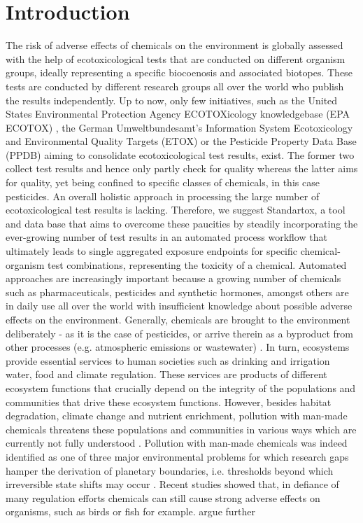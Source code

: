 
\section*{Introduction}

The risk of adverse effects of chemicals on the environment is globally assessed with the help of ecotoxicological tests that are conducted on different organism groups, ideally representing a specific biocoenosis and associated biotopes. These tests are conducted by different research groups all over the world who publish the results independently. Up to now, only few initiatives, such as the United States Environmental Protection Agency ECOTOXicology knowledgebase (EPA ECOTOX) \citep{elonen_ecotoxicology_2018}, the German Umweltbundesamt's Information System Ecotoxicology and Environmental Quality Targets (ETOX) \citep{umweltbundesamt_etox_2019} or the Pesticide Property Data Base (PPDB) \citep{lewis_international_2016} aiming to consolidate ecotoxicological test results, exist. The former two collect test results and hence only partly check for quality whereas the latter aims for quality, yet being confined to specific classes of chemicals, in this case pesticides. An overall holistic approach in processing the large number of ecotoxicological test results is lacking. Therefore, we suggest Standartox, a tool and data base that aims to overcome these paucities by steadily incorporating the ever-growing number of test results in an automated process workflow that ultimately leads to single aggregated exposure endpoints for specific chemical-organism test combinations, representing the toxicity of a chemical. Automated approaches are increasingly important because a growing number of chemicals such as pharmaceuticals, pesticides and synthetic hormones, amongst others are in daily use all over the world with insufficient knowledge about possible adverse effects on the environment. Generally, chemicals are brought to the environment deliberately - as it is the case of pesticides, or arrive therein as a byproduct from other processes (e.g. atmospheric emissions or wastewater) \citep{schwarzenbach_challenge_2006}. In turn, ecosystems provide essential services to human societies such as drinking and irrigation water, food and climate regulation. These services are products of different ecosystem functions that crucially depend on the integrity of the populations and communities that drive these ecosystem functions. However, besides habitat degradation, climate change and nutrient enrichment, pollution with man-made chemicals threatens these populations and communities in various ways which are currently not fully understood \citep{steffen_anthropocene_2007}. Pollution with man-made chemicals was indeed identified as one of three major environmental problems for which research gaps hamper the derivation of planetary boundaries, i.e. thresholds beyond which irreversible state shifts may occur \citep{steffen_anthropocene_2007}. Recent studies showed that, in defiance of many regulation efforts \citep{schafer_future_2019} chemicals can still cause strong adverse effects on organisms, such as birds \citep{hallmann_declines_2014} or fish \citep{yamamuro_neonicotinoids_2019} for example. \citet{bernhardt_synthetic_2017} argue further 